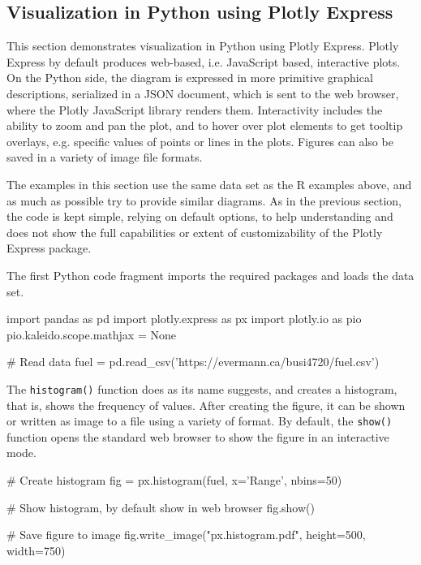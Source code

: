 \begin{withcode}
\section{Visualization in Python using Plotly Express}

This section demonstrates visualization in Python using Plotly Express. Plotly Express by default produces web-based, i.e. JavaScript based, interactive plots. On the Python side, the diagram is expressed in more primitive graphical descriptions, serialized in a JSON document, which is sent to the web browser, where the Plotly JavaScript library renders them. Interactivity includes the ability to zoom and pan the plot, and to hover over plot elements to get tooltip overlays, e.g. specific values of points or lines in the plots. Figures can also be saved in a variety of image file formats.

The examples in this section use the same data set as the R examples above, and as much as possible try to provide similar diagrams. As in the previous section, the code is kept simple, relying on default options, to help understanding and does not show the full capabilities or extent of customizability of the Plotly Express package. 

The first Python code fragment imports the required packages and loads the data set. 

\begin{pythoncode}
import pandas as pd
import plotly.express as px
import plotly.io as pio
pio.kaleido.scope.mathjax = None

# Read data
fuel = pd.read_csv('https://evermann.ca/busi4720/fuel.csv')
\end{pythoncode}

\noindent The \texttt{histogram()} function does as its name suggests, and creates a histogram, that is, shows the frequency of values. After creating the figure, it can be shown or written as image to a file using a variety of format. By default, the \texttt{show()} function opens the standard web browser to show the figure in an interactive mode.

\begin{pythoncode}
# Create histogram
fig = px.histogram(fuel, x='Range', nbins=50)

# Show histogram, by default show in web browser
fig.show()

# Save figure to image
fig.write_image("px.histogram.pdf", height=500, width=750)
\end{pythoncode}


\end{withcode}
